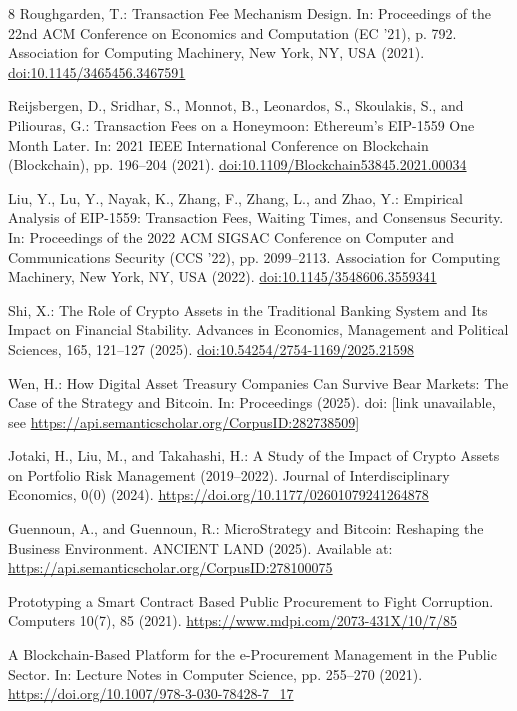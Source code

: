 \documentclass[runningheads]{llncs}
\begin{document}
\begin{thebibliography}{8}
Roughgarden, T.:
Transaction Fee Mechanism Design.
In: Proceedings of the 22nd ACM Conference on Economics and Computation (EC '21),
p. 792. Association for Computing Machinery, New York, NY, USA (2021).
\url{doi:10.1145/3465456.3467591}

Reijsbergen, D., Sridhar, S., Monnot, B., Leonardos, S., Skoulakis, S., and Piliouras, G.:
Transaction Fees on a Honeymoon: Ethereum's EIP-1559 One Month Later.
In: 2021 IEEE International Conference on Blockchain (Blockchain),
pp. 196--204 (2021).
\url{doi:10.1109/Blockchain53845.2021.00034}

Liu, Y., Lu, Y., Nayak, K., Zhang, F., Zhang, L., and Zhao, Y.:
Empirical Analysis of EIP-1559: Transaction Fees, Waiting Times, and Consensus Security.
In: Proceedings of the 2022 ACM SIGSAC Conference on Computer and Communications Security (CCS '22),
pp. 2099--2113. Association for Computing Machinery, New York, NY, USA (2022).
\url{doi:10.1145/3548606.3559341}

Shi, X.:
The Role of Crypto Assets in the Traditional Banking System and Its Impact on Financial Stability.
Advances in Economics, Management and Political Sciences, 165, 121--127 (2025).
\url{doi:10.54254/2754-1169/2025.21598}


Wen, H.:
How Digital Asset Treasury Companies Can Survive Bear Markets: The Case of the Strategy and Bitcoin.
In: Proceedings (2025).
doi: [link unavailable, see \url{https://api.semanticscholar.org/CorpusID:282738509]}

Jotaki, H., Liu, M., and Takahashi, H.:
A Study of the Impact of Crypto Assets on Portfolio Risk Management (2019--2022).
Journal of Interdisciplinary Economics, 0(0) (2024).
\url{https://doi.org/10.1177/02601079241264878}

Guennoun, A., and Guennoun, R.:
MicroStrategy and Bitcoin: Reshaping the Business Environment.
ANCIENT LAND (2025).
Available at: \url{https://api.semanticscholar.org/CorpusID:278100075}






Prototyping a Smart Contract Based Public Procurement to Fight Corruption.
Computers 10(7), 85 (2021).
\url{https://www.mdpi.com/2073-431X/10/7/85}

A Blockchain-Based Platform for the e-Procurement Management in the Public Sector.
In: Lecture Notes in Computer Science, pp. 255--270 (2021).
\url{https://doi.org/10.1007/978-3-030-78428-7_17}


\end{thebibliography}
\end{document}
